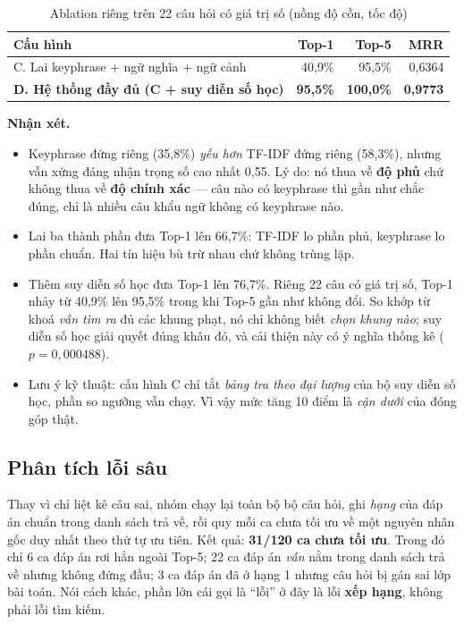 \begin{table}[H]
\centering
\caption{Ablation riêng trên 22 câu hỏi có giá trị số (nồng độ cồn, tốc độ)}
\label{tab:ablation-so}
\renewcommand{\arraystretch}{1.2}
\begin{tabularx}{\textwidth}{@{}L r r r@{}}
\toprule
\textbf{Cấu hình} & \textbf{Top-1} & \textbf{Top-5} & \textbf{MRR} \\
\midrule
C. Lai keyphrase + ngữ nghĩa + ngữ cảnh          & 40,9\% & 95,5\%  & 0,6364 \\
\textbf{D. Hệ thống đầy đủ (C + suy diễn số học)} & \textbf{95,5\%} & \textbf{100,0\%} & \textbf{0,9773} \\
\bottomrule
\end{tabularx}
\end{table}

\textbf{Nhận xét.}
\begin{itemize}
  \item Keyphrase đứng riêng (35,8\%) \emph{yếu hơn} TF-IDF đứng riêng (58,3\%), nhưng vẫn xứng
        đáng nhận trọng số cao nhất 0,55. Lý do: nó thua về \textbf{độ phủ} chứ không thua về
        \textbf{độ chính xác} --- câu nào có keyphrase thì gần như chắc đúng, chỉ là nhiều câu
        khẩu ngữ không có keyphrase nào.
  \item Lai ba thành phần đưa Top-1 lên 66,7\%: TF-IDF lo phần phủ, keyphrase lo phần chuẩn.
        Hai tín hiệu bù trừ nhau chứ không trùng lặp.
  \item Thêm suy diễn số học đưa Top-1 lên 76,7\%. Riêng 22 câu có giá trị số, Top-1 nhảy từ
        40,9\% lên 95,5\% trong khi Top-5 gần như không đổi. So khớp từ khoá \emph{vẫn tìm ra}
        đủ các khung phạt, nó chỉ không biết \emph{chọn khung nào}; suy diễn số học giải quyết
        đúng khâu đó, và cải thiện này có ý nghĩa thống kê ($p = 0{,}000488$).
  \item Lưu ý kỹ thuật: cấu hình C chỉ tắt \emph{bảng tra theo đại lượng} của bộ suy diễn số
        học, phần so ngưỡng vẫn chạy. Vì vậy mức tăng 10 điểm là \emph{cận dưới} của đóng góp
        thật.
\end{itemize}

\subsection{Phân tích lỗi sâu}

Thay vì chỉ liệt kê câu sai, nhóm chạy lại toàn bộ bộ câu hỏi, ghi \emph{hạng} của đáp án chuẩn
trong danh sách trả về, rồi quy mỗi ca chưa tối ưu về một nguyên nhân gốc duy nhất theo thứ tự
ưu tiên. Kết quả: \textbf{31/120 ca chưa tối ưu}. Trong đó chỉ 6 ca đáp án rơi hẳn ngoài
Top-5; 22 ca đáp án \emph{vẫn} nằm trong danh sách trả về nhưng không đứng đầu; 3 ca đáp án đã
ở hạng 1 nhưng câu hỏi bị gán sai lớp bài toán. Nói cách khác, phần lớn cái gọi là ``lỗi'' ở đây
là lỗi \textbf{xếp hạng}, không phải lỗi tìm kiếm.

